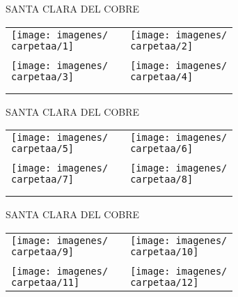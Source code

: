 \documentclass[10pt,letter]{report}
\begin{document}
\renewcommand{\carpetaa}{santa_clara_del_cobre}

\begin{center}
	\textcolor{principal}{SANTA CLARA DEL COBRE}
\end{center}
\begin{table}[H]
\centering

\footnotesize
	\begin{tabular}{m{7cm}m{1cm}m{7cm}}
	
	\texttt{[image: imagenes/\\carpetaa/1]}&&\texttt{[image: imagenes/\\carpetaa/2]}
	\\
	\\
	\texttt{[image: imagenes/\\carpetaa/3]}&&\texttt{[image: imagenes/\\carpetaa/4]}\\
	\\
	\\
	
	\end{tabular}
	
\end{table}
\newpage

\begin{center}
	\textcolor{principal}{SANTA CLARA DEL COBRE}
\end{center}
\begin{table}[H]
\centering

\footnotesize
	\begin{tabular}{m{7cm}m{1cm}m{7cm}}
	
	\texttt{[image: imagenes/\\carpetaa/5]}&&\texttt{[image: imagenes/\\carpetaa/6]}
	\\
	\\
	\texttt{[image: imagenes/\\carpetaa/7]}&&\texttt{[image: imagenes/\\carpetaa/8]}\\
	\\
	\\
	
	\end{tabular}
	
\end{table}
\newpage

\begin{center}
	\textcolor{principal}{SANTA CLARA DEL COBRE}
\end{center}
\begin{table}[H]
\centering

\footnotesize
	\begin{tabular}{m{7cm}m{1cm}m{7cm}}
	
	\texttt{[image: imagenes/\\carpetaa/9]}&&\texttt{[image: imagenes/\\carpetaa/10]}
	\\
	\\
	\texttt{[image: imagenes/\\carpetaa/11]}&&\texttt{[image: imagenes/\\carpetaa/12]}
	
	\end{tabular}
	
\end{table}
\newpage
\end{document}

